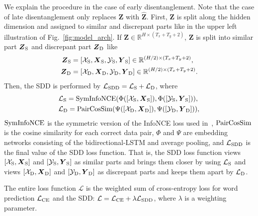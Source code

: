 We explain the procedure in the case of early disentanglement.
Note that the case of late disentanglement only replaces  $\boldsymbol{Z}$ with $\boldsymbol{\hat{Z}}$.
First, $\boldsymbol{Z}$ is split along the hidden dimension and assigned to similar and discrepant parts like in the upper left illustration of Fig.~\ref{fig:model_arch}.
If $\boldsymbol{Z} \in \mathbb{R}^{H \times (T_x+T_y+2)}$, $\boldsymbol{Z}$ is split into similar part $\boldsymbol{Z}_{\rm S}$ and discrepant part $\boldsymbol{Z}_{\rm D}$ like
\begin{align}
    \boldsymbol{Z}_{\rm S} &= [\mathcal{X}_{\rm S}, \boldsymbol{X}_{\rm S}, \mathcal{Y}_{\rm S}, \boldsymbol{Y}_{\rm S}] \in \mathbb{R}^{(H/2) \times (T_x+T_y+2)}, \\
    \boldsymbol{Z}_{\rm D} &= [\mathcal{X}_{\rm D}, \boldsymbol{X}_{\rm D}, \mathcal{Y}_{\rm D}, \boldsymbol{Y}_{\rm D}] \in \mathbb{R}^{(H/2) \times (T_x+T_y+2)}.
\end{align}
Then, the SDD is performed by $\mathcal{L}_{\rm SDD} = \mathcal{L}_{\rm S} + \mathcal{L}_{\rm D}$, where
\begin{align}
    &\mathcal{L}_{\rm S} = {\rm SymInfoNCE}(\Phi([\mathcal{X}_{\rm S}, \boldsymbol{X}_{\rm S}]), \Phi([\mathcal{Y}_{\rm S}, \boldsymbol{Y}_{\rm S}])), \\
    &\mathcal{L}_{\rm D} = {\rm PairCosSim}(\Psi([\mathcal{X}_{\rm D}, \boldsymbol{X}_{\rm D}]), \Psi([\mathcal{Y}_{\rm D}, \boldsymbol{Y}_{\rm D}])), 
\end{align}
${\rm SymInfoNCE}$ is the symmetric version of the InfoNCE loss used in~\cite{radford2021learning}, ${\rm PairCosSim}$ is the cosine similarity for each correct data pair,  $\Phi$ and $\Psi$ are embedding networks consisting of the bidirectional-LSTM and average pooling, and $\mathcal{L}_{\rm SDD}$ is the final value of the SDD loss function.
That is, the SDD loss function views $[\mathcal{X}_{\rm S}, \boldsymbol{X}_{\rm S}]$ and $[\mathcal{Y}_{\rm S}, \boldsymbol{Y}_{\rm S}]$ as similar parts and brings them closer by using $\mathcal{L}_{\rm S}$ and views $[\mathcal{X}_{\rm D}, \boldsymbol{X}_{\rm D}]$ and $[\mathcal{Y}_{\rm D}, \boldsymbol{Y}_{\rm D}]$ as discrepant parts and keeps them apart by $\mathcal{L}_{\rm D}$.

The entire loss function $\mathcal{L}$ is the weighted sum of cross-entropy loss for word prediction $\mathcal{L}_{\rm CE}$ and the SDD: $\mathcal{L} = \mathcal{L}_{\rm CE} + \lambda \mathcal{L}_{\rm SDD}$, where $\lambda$ is a weighting parameter.

